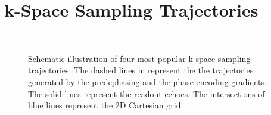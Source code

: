 \section{k-Space Sampling Trajectories} \label{Sec:mri-ktrj}
\begin{figure}[tb]
  \centering
   \quad
   \\
   \quad
  \caption{Schematic illustration of four most popular k-space sampling trajectories. The dashed lines in \protect{} represent the the trajectories generated by the predephasing and the phase-encoding gradients. The solid lines represent the readout echoes. The intersections of blue lines represent the 2D Cartesian grid.}
  \label{Fig:mri-trj}
\end{figure}
